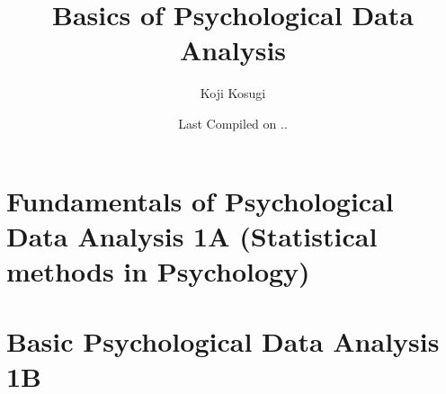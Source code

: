 \documentclass{ltjsbook}
\begin{document}

\VerbatimFootnotes
\title{Basics of Psychological Data Analysis}
\author{Koji Kosugi}
\date{Last Compiled on \number\year .\number\month .\number\day}
\maketitle
\setcounter{tocdepth}{1}



\tableofcontents

\linenumbers
\part{Fundamentals of Psychological Data Analysis 1A (Statistical methods in Psychology)}















\part{Basic Psychological Data Analysis 1B}















\end{document}
